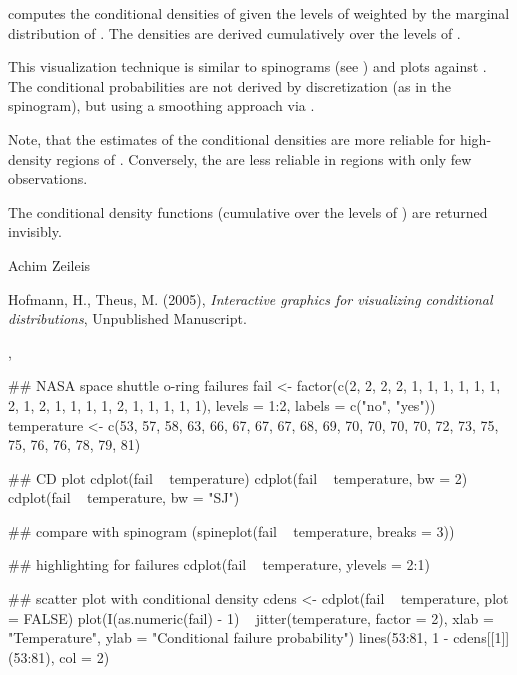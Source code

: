 %
\begin{Details}\relax
{} computes the conditional densities of  given
the levels of  weighted by the marginal distribution of .
The densities are derived cumulatively over the levels of .

This visualization technique is similar to spinograms (see )
and plots  against . The conditional probabilities
are not derived by discretization (as in the spinogram), but using a smoothing
approach via .

Note, that the estimates of the conditional densities are more reliable for 
high-density regions of . Conversely, the are less reliable in regions
with only few  observations.
\end{Details}
%
\begin{Value}
The conditional density functions (cumulative over the levels of )
are returned invisibly.
\end{Value}
%
\begin{Author}\relax
Achim Zeileis 
\end{Author}
%
\begin{References}\relax
Hofmann, H., Theus, M. (2005), \emph{Interactive graphics for visualizing
conditional distributions}, Unpublished Manuscript.
\end{References}
%
\begin{SeeAlso}\relax
{}, 
\end{SeeAlso}
%
\begin{Examples}
\begin{ExampleCode}
## NASA space shuttle o-ring failures
fail <- factor(c(2, 2, 2, 2, 1, 1, 1, 1, 1, 1, 2, 1, 2, 1, 1, 1,
                 1, 2, 1, 1, 1, 1, 1),
               levels = 1:2, labels = c("no", "yes"))
temperature <- c(53, 57, 58, 63, 66, 67, 67, 67, 68, 69, 70, 70,
                 70, 70, 72, 73, 75, 75, 76, 76, 78, 79, 81)

## CD plot
cdplot(fail ~ temperature)
cdplot(fail ~ temperature, bw = 2)
cdplot(fail ~ temperature, bw = "SJ")

## compare with spinogram
(spineplot(fail ~ temperature, breaks = 3))

## highlighting for failures
cdplot(fail ~ temperature, ylevels = 2:1)

## scatter plot with conditional density
cdens <- cdplot(fail ~ temperature, plot = FALSE)
plot(I(as.numeric(fail) - 1) ~ jitter(temperature, factor = 2),
     xlab = "Temperature", ylab = "Conditional failure probability")
lines(53:81, 1 - cdens[[1]](53:81), col = 2)
\end{ExampleCode}
\end{Examples}
